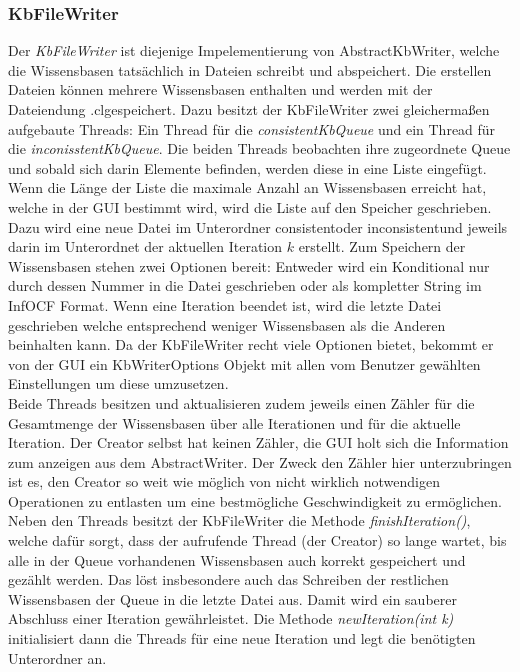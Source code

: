 \documentclass[12pt,a4paper]{article}
\begin{document}
\subsubsection{KbFileWriter}
\label{sec:kbfilewriter}
Der \textit{KbFileWriter} ist diejenige Impelementierung von AbstractKbWriter, welche die Wissensbasen tatsächlich in Dateien schreibt und abspeichert. Die erstellen Dateien können mehrere Wissensbasen enthalten und werden mit der Dateiendung \glqq .cl\grqq \space gespeichert. Dazu besitzt der KbFileWriter zwei gleichermaßen aufgebaute Threads: Ein Thread für die \textit{consistentKbQueue} und ein Thread für die \textit{inconisstentKbQueue}. Die beiden Threads beobachten ihre zugeordnete Queue und sobald sich darin Elemente befinden, werden diese in eine Liste eingefügt. Wenn die Länge der Liste die maximale Anzahl an Wissensbasen erreicht hat, welche in der GUI bestimmt wird, wird die Liste auf den Speicher geschrieben. Dazu wird eine neue  Datei im Unterordner \glqq consistent\grqq \space oder \glqq inconsistent\grqq \space  und jeweils darin im Unterordnet der aktuellen Iteration $k$ erstellt. Zum Speichern der Wissensbasen stehen zwei Optionen bereit: Entweder wird ein Konditional nur durch dessen Nummer in die Datei geschrieben oder als kompletter String im InfOCF Format. Wenn eine Iteration beendet ist, wird die letzte Datei geschrieben welche entsprechend weniger Wissensbasen als die Anderen beinhalten kann. Da der KbFileWriter recht viele Optionen bietet, bekommt er von der GUI ein KbWriterOptions Objekt mit allen vom Benutzer gewählten Einstellungen um diese umzusetzen.\\
Beide Threads besitzen und aktualisieren zudem jeweils einen Zähler für die Gesamtmenge der Wissensbasen über alle Iterationen und für die aktuelle Iteration. Der Creator selbst hat keinen Zähler, die GUI holt sich die Information zum anzeigen aus dem AbstractWriter. Der Zweck den Zähler hier unterzubringen ist es, den Creator so weit wie möglich von nicht wirklich notwendigen Operationen zu entlasten um eine bestmögliche Geschwindigkeit zu ermöglichen.\\
Neben den Threads besitzt der KbFileWriter die Methode \textit{finishIteration()}, welche dafür sorgt, dass der aufrufende Thread (der Creator) so lange wartet, bis alle in der Queue vorhandenen Wissensbasen auch korrekt gespeichert und gezählt werden. Das löst insbesondere auch das Schreiben der restlichen Wissensbasen der Queue in die letzte Datei aus. Damit wird ein sauberer Abschluss einer Iteration gewährleistet. Die Methode \textit{newIteration(int k)} initialisiert dann die Threads für eine neue Iteration und legt die benötigten Unterordner an. \\
\end{document}

